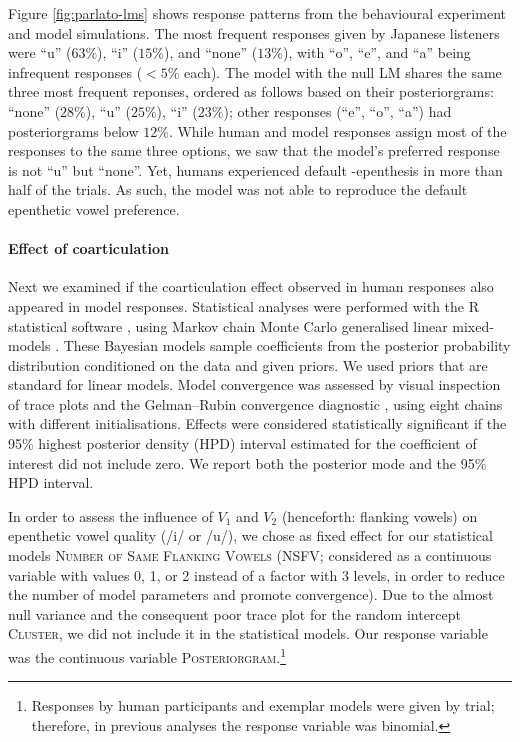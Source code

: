 {Figure \ref{fig:parlato-lms} shows response patterns from the behavioural experiment and model simulations. The most frequent responses given by Japanese listeners were ``u'' ($63\%$), ``i'' ($15\%$), and ``none'' ($13\%$), with ``o'', ``e'', and ``a'' being infrequent responses ($<5\%$ each). The model with the null LM shares the same three most frequent reponses, ordered as follows based on their posteriorgrams: ``none'' ($28\%$), ``u'' ($25\%$), ``i'' ($23\%$); other responses (``e'', ``o'', ``a'') had posteriorgrams below $12\%$. While human and model responses assign most of the responses to the same three options, we saw that the model's preferred response is not ``u'' but ``none''. Yet, humans experienced default -epenthesis in more than half of the trials. As such, the model was not able to reproduce the default epenthetic vowel preference.          

\paragraph{Effect of coarticulation}

Next we examined if the coarticulation effect observed in human responses also appeared in model responses. Statistical analyses were performed with the R statistical software \cite{R-base}, using Markov chain Monte Carlo generalised linear mixed-models \cite{R-MCMCglmm, R-coda}. These Bayesian models sample coefficients from the posterior probability distribution conditioned on the data and given priors. We used priors that are standard for linear models. Model convergence was assessed by visual inspection of trace plots and the Gelman–Rubin convergence diagnostic \cite{gelman1992}, using eight chains with different initialisations. Effects were considered statistically significant if the 95\% highest posterior density (HPD) interval estimated for the coefficient of interest did not include zero. We report both the posterior mode and the 95\% HPD interval.  

In order to assess the influence of $V_{1}$ and $V_{2}$ (henceforth: flanking vowels) on epenthetic vowel quality (/i/ or /u/), we chose as fixed effect for our statistical models \textsc{Number of Same Flanking Vowels} (\textsc{NSFV}; considered as a continuous variable with values 0, 1, or 2 instead of a factor with 3 levels, in order to reduce the number of model parameters and promote convergence). Due to the almost null variance and the consequent poor trace plot for the random intercept \textsc{Cluster}, we did not include it in the statistical models. Our response variable was the continuous variable \textsc{Posteriorgram}.\footnote{Responses by human participants and exemplar models were given by trial; therefore, in previous analyses the response variable was binomial.}

}
